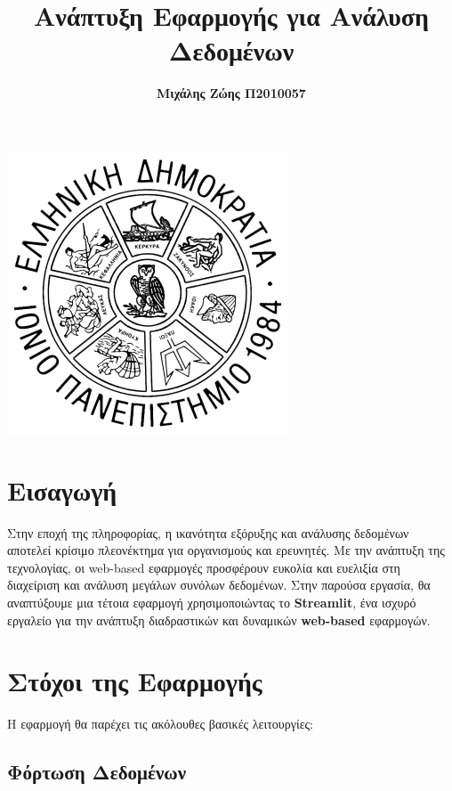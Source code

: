 \documentclass{article}
\title{\textbf{Ανάπτυξη Εφαρμογής για Ανάλυση Δεδομένων}}
\author{\textbf{Μιχάλης Ζώης Π2010057}}
\date{}
\begin{document}
\maketitle
\thispagestyle{empty}
\begin{center}
    \includegraphics[width=0.5\linewidth]{ionian_university.png}
\end{center}

\newpage
\tableofcontents
\setcounter{page}{1}
\newpage

\section{Εισαγωγή}

Στην εποχή της πληροφορίας, η ικανότητα εξόρυξης και ανάλυσης δεδομένων αποτελεί κρίσιμο πλεονέκτημα για οργανισμούς και ερευνητές. Με την ανάπτυξη της τεχνολογίας, οι web-based εφαρμογές προσφέρουν ευκολία και ευελιξία στη διαχείριση και ανάλυση μεγάλων συνόλων δεδομένων. Στην παρούσα εργασία, θα αναπτύξουμε μια τέτοια εφαρμογή χρησιμοποιώντας το \textbf{Streamlit}, ένα ισχυρό εργαλείο για την ανάπτυξη διαδραστικών και δυναμικών \textbf{web-based} εφαρμογών. 

\section{Στόχοι της Εφαρμογής}

Η εφαρμογή θα παρέχει τις ακόλουθες βασικές λειτουργίες:

\subsection{Φόρτωση Δεδομένων}
\end{document}
